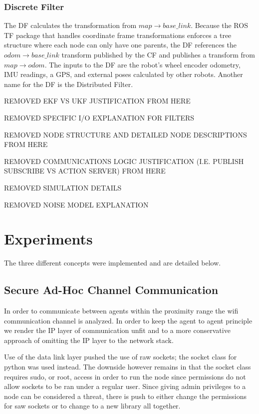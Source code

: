 \documentclass[conference]{IEEEtran}
\begin{document}
\subsubsection{Discrete Filter} \label{disc_filter_subsubsection}
The DF calculates the transformation from $map \rightarrow base\_link$. Because the ROS TF package that handles coordinate frame transformations enforces a tree structure where each node can only have one parents, the DF references the $odom \rightarrow base\_link$ transform published by the CF and publishes a transform from $map \rightarrow odom$. The inputs to the DF are the robot's wheel encoder odometry, IMU readings, a GPS, and external poses calculated by other robots. Another name for the DF is the Distributed Filter.

REMOVED EKF VS UKF JUSTIFICATION FROM HERE
 
REMOVED SPECIFIC I/O EXPLANATION FOR FILTERS
 
REMOVED NODE STRUCTURE AND DETAILED NODE DESCRIPTIONS FROM HERE

REMOVED COMMUNICATIONS LOGIC JUSTIFICATION (I.E. PUBLISH SUBSCRIBE VS ACTION SERVER) FROM HERE

REMOVED SIMULATION DETAILS

REMOVED NOISE MODEL EXPLANATION

\section{Experiments}

The three different concepts were implemented and are detailed below.

\subsection{Secure Ad-Hoc Channel Communication}

In order to communicate between agents within the proximity range the wifi communication channel is analyzed. In order to keep the agent to agent principle we render the IP layer of communication unfit and to a more conservative approach of omitting the IP layer to the network stack.

Use of the data link layer pushed the use of raw sockets; the socket class for python was used instead. The downside however remains in that the socket class requires sudo, or root, access in order to run the node since permissions do not allow sockets to be ran under a regular user. Since giving admin privileges to a node can be considered a threat, there is push to either change the permissions for saw sockets or to change to a new library all together.
\end{document}
